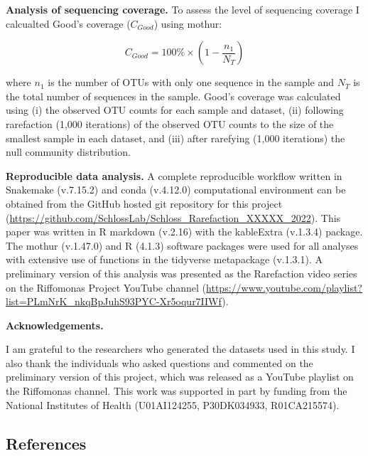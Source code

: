 \documentclass[
]{article}
\begin{document}
\textbf{Analysis of sequencing coverage.} To assess the level of
sequencing coverage I calcualted Good's coverage (\(C_{Good}\)) using
mothur:

\[C_{Good} = 100\% \times \left(1-\frac{n_1}{N_T} \right)\]

where \(n_1\) is the number of OTUs with only one sequence in the sample
and \(N_T\) is the total number of sequences in the sample. Good's
coverage was calculated using (i) the observed OTU counts for each
sample and dataset, (ii) following rarefaction (1,000 iterations) of the
observed OTU counts to the size of the smallest sample in each dataset,
and (iii) after rarefying (1,000 iterations) the null community
distribution.

\textbf{Reproducible data analysis.} A complete reproducible workflow
written in Snakemake (v.7.15.2) and conda (v.4.12.0) computational
environment can be obtained from the GitHub hosted git repository for
this project
(\url{https://github.com/SchlossLab/Schloss_Rarefaction_XXXXX_2022}).
This paper was written in R markdown (v.2.16) with the kableExtra
(v.1.3.4) package. The mothur (v.1.47.0) and R (4.1.3) software packages
were used for all analyses with extensive use of functions in the
tidyverse metapackage (v.1.3.1). A preliminary version of this analysis
was presented as the Rarefaction video series on the Riffomonas Project
YouTube channel
(\url{https://www.youtube.com/playlist?list=PLmNrK_nkqBpJuhS93PYC-Xr5oqur7IIWf}).

\vspace{10mm}

\textbf{Acknowledgements.}

I am grateful to the researchers who generated the datasets used in this
study. I also thank the individuals who asked questions and commented on
the preliminary version of this project, which was released as a YouTube
playlist on the Riffomonas channel. This work was supported in part by
funding from the National Institutes of Health (U01AI124255,
P30DK034933, R01CA215574).

\newpage

\hypertarget{references}{%
\subsection{References}\label{references}}

\setlength{\parindent}{-0.25in}
\setlength{\leftskip}{0.25in}

\noindent
\end{document}
